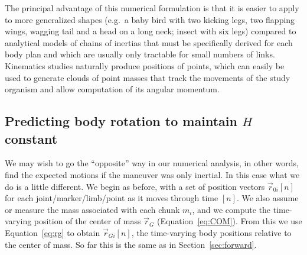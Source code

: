The principal advantage of this numerical formulation is that it is easier to apply to more generalized shapes (e.g.\ a baby bird with two kicking legs, two flapping wings, wagging tail and a head on a long neck; insect with six legs) compared to analytical models of chains of inertias that must be specifically derived for each body plan \cite{Jusufi:2008, Jusufi:2010, Evangelista:unpub2} and which are usually only tractable for small numbers of links.  Kinematics studies naturally produce positions of points, which can easily be used to generate clouds of point masses that track the movements of the study organism and allow computation of its angular momentum. 






\subsection{Predicting body rotation to maintain $H$ constant}
\label{sec:reverse}
We may wish to go the ``opposite'' way in our numerical analysis, in other words, find the expected motions if the maneuver was only inertial.  In this case what we do is a little different.  We begin as before, with a set of position vectors $\vec{r}_{0i}[n]$ for each joint/marker/limb/point as it moves through time $[n]$. We also assume or measure the mass associated with each chunk $m_i$, and we compute the time-varying position of the center of mass $\vec{r}_G$ (Equation~\ref{eq:COM}). From this we use Equation~\ref{eq:rg} to obtain $\vec{r}_{Gi}[n]$, the time-varying body positions relative to the center of mass. So far this is the same as in Section~\ref{sec:forward}. 

